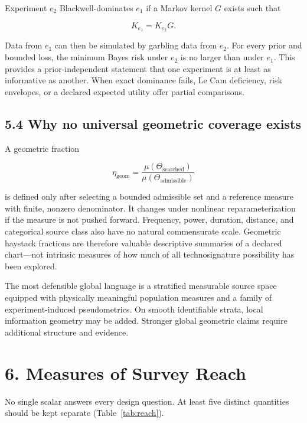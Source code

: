 \documentclass[11pt,a4paper]{article}
\begin{document}
Experiment \(e_2\) Blackwell-dominates \(e_1\) if a Markov kernel \(G\) exists such that \citep{blackwell1953,lecam1986,torgersen1991}

\begin{equation}
K_{e_1}=K_{e_2}G.
\end{equation}

Data from \(e_1\) can then be simulated by garbling data from \(e_2\). For every prior and bounded loss, the minimum Bayes risk under \(e_2\) is no larger than under \(e_1\). This provides a prior-independent statement that one experiment is at least as informative as another. When exact dominance fails, Le Cam deficiency, risk envelopes, or a declared expected utility offer partial comparisons.

\subsection{5.4 Why no universal geometric coverage exists}\label{54-why-no-universal-geometric-coverage-exists}

A geometric fraction

\begin{equation}
\eta_{\mathrm{geom}}
=\frac{\mu(\Theta_{\mathrm{searched}})}
{\mu(\Theta_{\mathrm{admissible}})}
\end{equation}

is defined only after selecting a bounded admissible set and a reference measure with finite, nonzero denominator. It changes under nonlinear reparameterization if the measure is not pushed forward. Frequency, power, duration, distance, and categorical source class also have no natural commensurate scale. Geometric haystack fractions are therefore valuable descriptive summaries of a declared chart---not intrinsic measures of how much of all technosignature possibility has been explored.

The most defensible global language is a stratified measurable source space equipped with physically meaningful population measures and a family of experiment-induced pseudometrics. On smooth identifiable strata, local information geometry may be added. Stronger global geometric claims require additional structure and evidence.

\section{6. Measures of Survey Reach}\label{6-measures-of-survey-reach}

No single scalar answers every design question. At least five distinct quantities should be kept separate (Table~\ref{tab:reach}).
\end{document}
